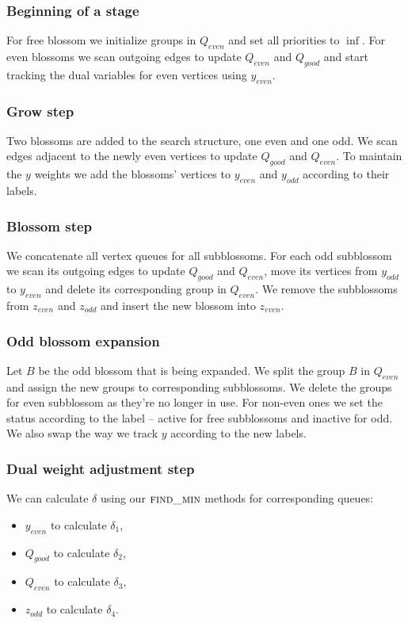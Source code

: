 \subsubsection*{Beginning of a stage}
For free blossom we initialize groups in $Q_{even}$ and set all priorities to $\inf$. For even blossoms we  scan outgoing edges to update $Q_{even}$ and $Q_{good}$ and start tracking the dual variables for even vertices using $y_{even}$.

\subsubsection*{Grow step}
Two blossoms are added to the search structure, one even and one odd. We scan edges adjacent to the newly even vertices to update $Q_{good}$ and $Q_{even}$. To maintain the $y$ weights we add the blossoms' vertices to $y_{even}$ and $y_{odd}$ according to their labels.

\subsubsection*{Blossom step}
We concatenate all vertex queues for all subblossoms. For each odd subblossom we scan its outgoing edges to update $Q_{good}$ and $Q_{even}$, move its vertices from $y_{odd}$ to $y_{even}$ and delete its corresponding group in $Q_{even}$. We remove the subblossoms from $z_{even}$ and $z_{odd}$ and insert the new blossom into $z_{even}$.

\subsubsection*{Odd blossom expansion}
Let $B$ be the odd blossom that is being expanded. We split the group $B$ in $Q_{even}$ and assign the new groups to corresponding subblossoms. We delete the groups for even subblossom as they're no longer in use. For non-even ones we set the status according to the label – active for free subblossoms and inactive for odd. We also swap the way we track $y$ according to the new labels.

\subsubsection*{Dual weight adjustment step} We can calculate $\delta$ using our $\textsc{find\_min}$ methods for corresponding queues: 
\begin{itemize}
    \item $y_{even}$ to calculate $\delta_1$,
    \item $Q_{good}$ to calculate $\delta_2$,
    \item $Q_{even}$ to calculate $\delta_3$,
    \item $z_{odd}$ to calculate $\delta_4$.
\end{itemize}

